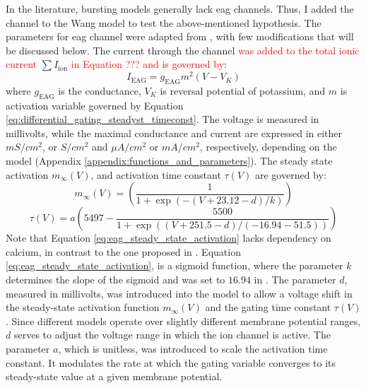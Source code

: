 \documentclass[../main.tex]{subfiles}
\begin{document}
In the literature, bursting models generally lack \gls{eag} channels. Thus, I added the channel to the Wang model to test the above-mentioned hypothesis. The parameters for \gls{eag} channel were adapted from \parencite{bronkRegulationEagCa22018}, with few modifications that will be discussed below. The current through the channel \textcolor{red}{was added to the total ionic current} $\sum I_{\text{ion}}$ \textcolor{red}{in Equation ??? and is governed by}:
\begin{equation}\label{eq:current_eag}
    I_{\text{EAG}} = g_{\text{EAG}} m^2 (V - V_K)
\end{equation}
where $g_{\text{EAG}}$ is the conductance, $V_K$ is reversal potential of potassium, and $m$ is activation variable governed by Equation \ref{eq:differential_gating_steadyst_timeconst}. The voltage is measured in millivolts, while the maximal conductance and current are expressed in either $mS/cm^2$, or $S/cm^2$ and $\mu A/cm^2$ or $mA/cm^2$, respectively, depending on the model (Appendix \ref{appendix:functions_and_parameters}). The steady state activation $m_{\infty}(V)$, and activation time constant $\tau(V)$ are governed by:
\begin{equation}\label{eq:eag_steady_state_activation}
    m_\infty(V) = \left( \frac{1}{1 + \exp{(-(V+23.12-d)/k)}} \right)
\end{equation}
\begin{equation} \label{eq:eag_tau_activation}
    \tau(V) = a\left(5497 - \frac{5500}{1 + \exp( (V + 251.5 - d) / (-16.94-51.5) ) }\right)
\end{equation}
Note that Equation \ref{eq:eag_steady_state_activation} lacks dependency on calcium, in contrast to the one proposed in \parencite{bronkRegulationEagCa22018}. Equation \ref{eq:eag_steady_state_activation}, is a sigmoid function, where the parameter $k$ determines the slope of the sigmoid and was set to $16.94$ in \parencite{bronkRegulationEagCa22018}. 
The parameter $d$, measured in millivolts, was introduced into the model to allow a voltage shift in the steady-state activation function  $m_\infty(V)$ and the gating time constant $\tau(V)$. Since different models operate over slightly different membrane potential ranges, $d$ serves to adjust the voltage range in which the ion channel is active.
The parameter $a$, which is unitless, was introduced to scale the activation time constant. It modulates the rate at which the gating variable converges to its steady-state value at a given membrane potential.
\end{document}
